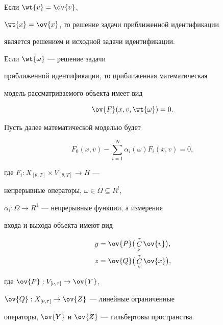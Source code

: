 \begin{note}


Если $\wt{v}=\ov{v}$,


$\wt{x}=\ov{x}$, то решение задачи приближенной идентификации


является решением и исходной задачи идентификации.


\end{note}





\begin{note}


Если $\wt{\omega}$ --- решение задачи


приближенной идентификации, то приближенная математическая


модель рассматриваемого объекта имеет вид


$$


\ov{F}(x,v,\wt{\omega})=0.


$$


\end{note}





Пусть далее математической моделью будет


\begin{equation}


F_0(x,v)-\sum\limits^N_{i=1}\alpha_i(\omega)F_i(x,v)=0,


\end{equation}


где $F_i:X_{[\theta,T]}\times V_{[\theta,T]}\to H$ ---


непрерывные операторы, $\omega\in\Omega\subseteq R^l$,


$\alpha_i:\Omega\to R^1$ --- непрерывные функции, а измерения


входа и выхода объекта имеют вид


\begin{align}


y&=\ov{P}\big(\Cu^\tau_\nu \ov{v}\big ),\\


z&=\ov{Q}\big (\Cu^\tau_\nu \ov{x}\big ),


\end{align}


где $\ov{P}:V_{[\nu,\tau]}\to\ov{Y}$,


$\ov{Q}:X_{[\nu,\tau]}\to\ov{Z}$ --- линейные ограниченные


операторы, $\ov{Y}$ и $\ov{Z}$ --- гильбертовы пространства.





